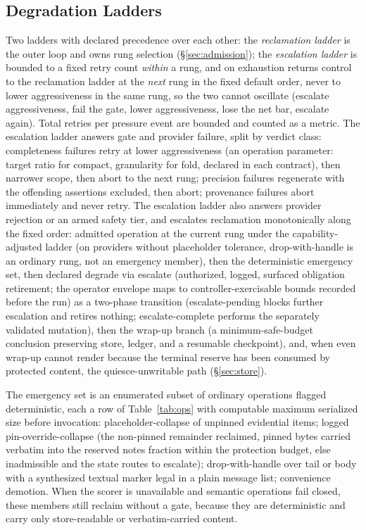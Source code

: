 \documentclass[11pt]{article}
\begin{document}
\subsection{Degradation Ladders}
\label{sec:ladder}
Two ladders with declared precedence over each other: the \emph{reclamation ladder} is the outer loop and owns rung selection (\S\ref{sec:admission}); the \emph{escalation ladder} is bounded to a fixed retry count \emph{within} a rung, and on exhaustion returns control to the reclamation ladder at the \emph{next} rung in the fixed default order, never to lower aggressiveness in the same rung, so the two cannot oscillate (escalate aggressiveness, fail the gate, lower aggressiveness, lose the net bar, escalate again). Total retries per pressure event are bounded and counted as a metric. The escalation ladder answers gate and provider failure, split by verdict class: completeness failures retry at lower aggressiveness (an operation parameter: target ratio for compact, granularity for fold, declared in each contract), then narrower scope, then abort to the next rung; precision failures regenerate with the offending assertions excluded, then abort; provenance failures abort immediately and never retry. The escalation ladder also answers provider rejection or an armed safety tier, and escalates reclamation monotonically along the fixed order: admitted operation at the current rung under the capability-adjusted ladder (on providers without placeholder tolerance, drop-with-handle is an ordinary rung, not an emergency member), then the deterministic emergency set, then declared degrade via escalate (authorized, logged, surfaced obligation retirement; the operator envelope maps to controller-exercisable bounds recorded before the run) as a two-phase transition (escalate-pending blocks further escalation and retires nothing; escalate-complete performs the separately validated mutation), then the wrap-up branch (a minimum-safe-budget conclusion preserving store, ledger, and a resumable checkpoint), and, when even wrap-up cannot render because the terminal reserve has been consumed by protected content, the quiesce-unwritable path (\S\ref{sec:store}).

The emergency set is an enumerated subset of ordinary operations flagged deterministic, each a row of Table~\ref{tab:ops} with computable maximum serialized size before invocation: placeholder-collapse of unpinned evidential items; logged pin-override-collapse (the non-pinned remainder reclaimed, pinned bytes carried verbatim into the reserved notes fraction within the protection budget, else inadmissible and the state routes to escalate); drop-with-handle over tail or body with a synthesized textual marker legal in a plain message list; convenience demotion. When the scorer is unavailable and semantic operations fail closed, these members still reclaim without a gate, because they are deterministic and carry only store-readable or verbatim-carried content.
\end{document}

